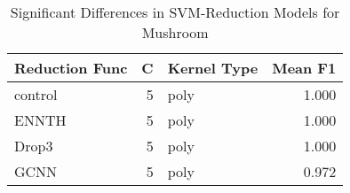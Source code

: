 \begin{table}[!htbp]
\centering
\caption{Significant Differences in SVM-Reduction Models for Mushroom}
\label{tab:svm_reduction_significant_pairs_mushroom}
\begin{tabular}{lrlr}
\toprule
Reduction Func & C & Kernel Type & Mean F1 \\
\midrule
control & 5 & poly & 1.000 \\
ENNTH & 5 & poly & 1.000 \\
Drop3 & 5 & poly & 1.000 \\
GCNN & 5 & poly & 0.972 \\
\bottomrule
\end{tabular}
\end{table}
